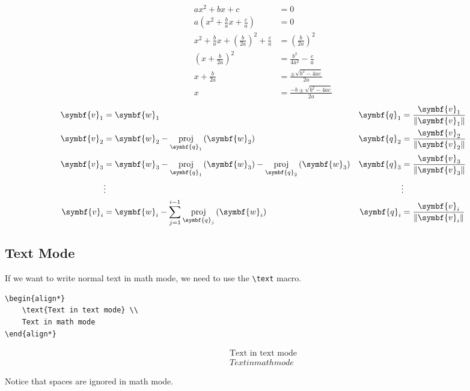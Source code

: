 \documentclass[11pt, twoside]{article}
\DeclareMathOperator{\proj}{proj}
\begin{document}
\begin{align}
    ax^2 + bx + c                                                    & = 0                                  \\
    a\left( x^2 + \frac{b}{a}x + \frac{c}{a} \right)                 & = 0                                  \\
    x^2 + \frac{b}{a}x + \left( \frac{b}{2a} \right)^2 + \frac{c}{a} & = \left( \frac{b}{2a} \right)^2      \\
    \left( x + \frac{b}{2a} \right)^2                                & = \frac{b^2}{4a^2} - \frac{c}{a}     \\
    x + \frac{b}{2a}                                                 & = \frac{\pm \sqrt{b^2 - 4ac}}{2a}    \\
    x                                                                & = \frac{-b \pm \sqrt{b^2 - 4ac}}{2a}
\end{align}
\begin{align*}
    \symbf{v}_1 & = \symbf{w}_1                                                                                                   & \symbf{q}_1 & = \frac{\symbf{v}_1}{\norm{\symbf{v}_1}} \\
    \symbf{v}_2 & = \symbf{w}_2 - \proj_{\symbf{q}_1} \left( \symbf{w}_2 \right)                                                  & \symbf{q}_2 & = \frac{\symbf{v}_2}{\norm{\symbf{v}_2}} \\
    \symbf{v}_3 & = \symbf{w}_3 - \proj_{\symbf{q}_1} \left( \symbf{w}_3 \right) - \proj_{\symbf{q}_2} \left( \symbf{w}_3 \right) & \symbf{q}_3 & = \frac{\symbf{v}_3}{\norm{\symbf{v}_3}} \\
                & \vdots                                                                                                          &             & \vdots                                   \\
    \symbf{v}_i & = \symbf{w}_i - \sum_{j = 1}^{i - 1} \proj_{\symbf{q}_j} \left( \symbf{w}_i \right)                             & \symbf{q}_i & = \frac{\symbf{v}_i}{\norm{\symbf{v}_i}}
\end{align*}
\pagebreak
\subsection{Text Mode}
If we want to write normal text in math mode, we need to use the \lstinline{\text} macro.
\begin{lstlisting}
\begin{align*}
    \text{Text in text mode} \\
    Text in math mode
\end{align*}
\end{lstlisting}
\begin{outputbox}
    \begin{align*}
        \text{Text in text mode} \\
        Text in math mode
    \end{align*}
\end{outputbox}
Notice that spaces are ignored in math mode.
\end{document}
